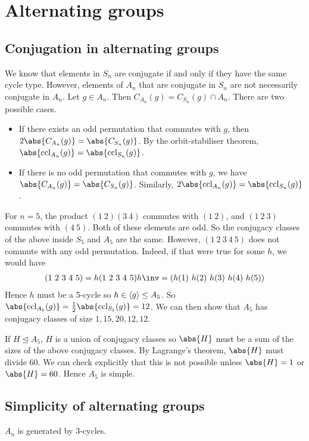\section{Alternating groups}

\subsection{Conjugation in alternating groups}
We know that elements in $S_n$ are conjugate if and only if they have the same cycle type.
However, elements of $A_n$ that are conjugate in $S_n$ are not necessarily conjugate in $A_n$.
Let $g \in A_n$.
Then $C_{A_n}(g) = C_{S_n}(g) \cap A_n$.
There are two possible cases.
\begin{itemize}
	\item If there exists an odd permutation that commutes with $g$, then $2\abs{C_{A_n}(g)} = \abs{C_{S_n}(g)}$.
	      By the orbit-stabiliser theorem, $\abs{\ccl_{A_n}(g)} = \abs{\ccl_{S_n}(g)}$.
	\item If there is no odd permutation that commutes with $g$, we have $\abs{C_{A_n}(g)} = \abs{C_{S_n}(g)}$.
	      Similarly, $2\abs{\ccl_{A_n}(g)} = \abs{\ccl_{S_n}(g)}$.
\end{itemize}
\begin{example}
	For $n = 5$, the product $(1\ 2)(3\ 4)$ commutes with $(1\ 2)$, and $(1\ 2\ 3)$ commutes with $(4\ 5)$.
	Both of these elements are odd.
	So the conjugacy classes of the above inside $S_5$ and $A_5$ are the same.
	However, $(1\ 2\ 3\ 4\ 5)$ does not commute with any odd permutation.
	Indeed, if that were true for some $h$, we would have
	\begin{align*}
		(1\ 2\ 3\ 4\ 5) = h (1\ 2\ 3\ 4\ 5) h\inv = (h(1)\ h(2)\ h(3)\ h(4)\ h(5))
	\end{align*}
	Hence $h$ must be a 5-cycle so $h \in \left\langle{} g \right\rangle \leq A_5$.
	So $\abs{\ccl_{A_5}(g)} = \frac{1}{2} \abs{\ccl_{S_5}(g)} = 12$.
	We can then show that $A_5$ has conjugacy classes of size $1, 15, 20, 12, 12$.

	If $H \trianglelefteq A_5$, $H$ is a union of conjugacy classes so $\abs{H}$ must be a sum of the sizes of the above conjugacy classes.
	By Lagrange's theorem, $\abs{H}$ must divide 60.
	We can check explicitly that this is not possible unless $\abs{H} = 1$ or $\abs{H} = 60$.
	Hence $A_5$ is simple.
\end{example}

\subsection{Simplicity of alternating groups}
\begin{lemma}
	$A_n$ is generated by 3-cycles.
\end{lemma}

